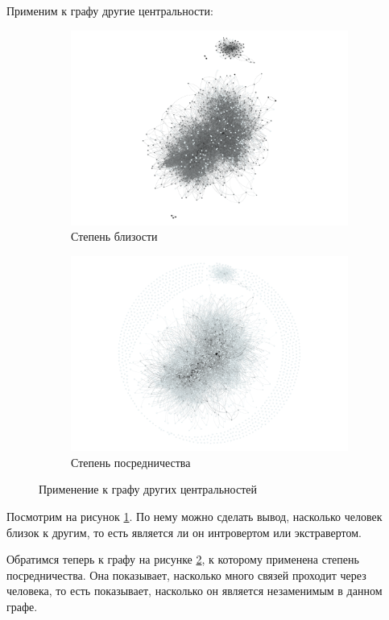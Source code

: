 Применим к графу другие центральности:
\begin{figure}[H]
    \centering
    \begin{subfigure}[b]{0.45\textwidth}
        \centering
        \includegraphics[width = \textwidth]{pictures/Clossenes Centrality.pdf}
        \caption{Степень близости}
        \label{fig:graph_clossenes}
    \end{subfigure}
    \begin{subfigure}[b]{0.45\textwidth}
        \centering
        \includegraphics[width = \textwidth]{pictures/Betweenes Centrality.pdf}
        \caption{Степень посредничества}
        \label{fig:graph_betweenes}
    \end{subfigure}
    \caption{Применение к графу других центральностей}
    \label{fig:graph_centrality}
\end{figure}
Посмотрим на рисунок \ref{fig:graph_clossenes}. По нему можно сделать вывод, насколько человек близок к другим, то есть является ли он интровертом или экстравертом.

Обратимся теперь к графу на рисунке \ref{fig:graph_betweenes}, к которому применена степень посредничества. Она показывает, насколько много связей проходит через человека, то есть показывает, насколько он является незаменимым в данном графе.